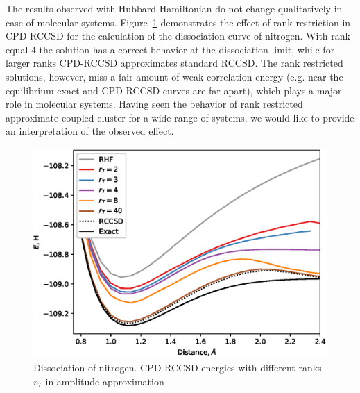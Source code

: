 The results observed with Hubbard Hamiltonian do not change qualitatively in 
case of molecular systems. Figure~\ref{fig:energy_vs_d_cc-pvdz} 
demonstrates the effect of rank restriction in CPD-RCCSD for the calculation of 
the dissociation curve of nitrogen. With rank equal 4 the solution has a 
correct behavior at the dissociation limit, while for larger ranks CPD-RCCSD 
approximates standard RCCSD. The rank restricted solutions, however, miss a 
fair amount of weak correlation energy (e.g. near the equilibrium exact and 
CPD-RCCSD curves are far apart), which plays a major role in molecular systems. 
Having seen the behavior of rank restricted approximate coupled cluster for a 
wide range of systems, we would like to provide an interpretation of the 
observed effect.
%
\begin{figure}[!ht]
\centering
\includegraphics[width=\columnwidth]
{figures/tcc_strong_correlation/energy_vs_d_cc-pvdz}
\caption{Dissociation of nitrogen. CPD-RCCSD energies with different ranks 
$r_{T}$ in amplitude approximation}
\label{fig:energy_vs_d_cc-pvdz}
\end{figure}
%

